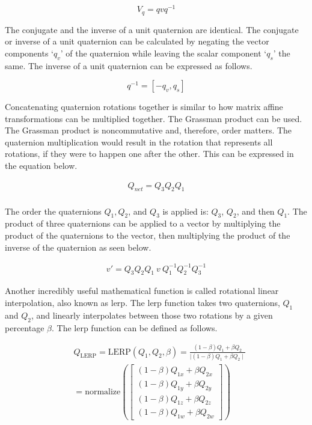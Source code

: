 \begin{equation}
	V_q = qvq^{-1}
\end{equation}

\noindent
The conjugate and the inverse of a unit quaternion are identical. The conjugate or inverse of a unit quaternion can be calculated by negating the vector components `$q_v$' of the quaternion while leaving the scalar component `$q_s$' the same. The inverse of a unit quaternion can be expressed as follows.

\begin{equation}
	q^{-1} = [-q_v, q_s]
\end{equation}

\noindent
Concatenating quaternion rotations together is similar to how matrix affine transformations can be multiplied together. The Grassman product can be used. The Grassman product is noncommutative and, therefore, order matters. The quaternion multiplication would result in the rotation that represents all rotations, if they were to happen one after the other. This can be expressed in the equation below.

\begin{equation}
\begin{aligned}
Q_{net} = Q_3 Q_2 Q_1\\
\end{aligned}
\end{equation}

\noindent
The order the quaternions $Q_1, Q_2$, and $Q_3$ is applied is: $Q_3$, $Q_2$, and then $Q_1$. The product of three quaternions can be applied to a vector by multiplying the product of the quaternions to the vector, then multiplying the product of the inverse of the quaternion as seen below. 

\begin{equation}
\begin{aligned}
v' = Q_3 Q_2 Q_1~ v~ Q_{1}^{-1} Q_{2}^{-1} Q_{3}^{-1}
\end{aligned}
\end{equation}

\noindent
Another incredibly useful mathematical function is called rotational linear interpolation, also known as \acrshort{lerp}. The \acrshort{lerp} function takes two quaternions, $Q_1$ and $Q_2$, and linearly interpolates between those two rotations by a given percentage  $\beta$. The \acrshort{lerp} function can be defined as follows.

\begin{equation}
\begin{aligned}
& Q_{\text{LERP}} = \text{LERP}(Q_1, Q_2, \beta) = \frac{(1-\beta)Q_1 + \beta Q_2}{\mid(1-\beta)Q_1 + \beta Q_2\mid} \\
& = \text{normalize} \left(\begin{bmatrix}
(1 - \beta) Q_{1x} + \beta Q_{2x}\\
(1 - \beta) Q_{1y} + \beta Q_{2y}\\
(1 - \beta) Q_{1z} + \beta Q_{2z}\\
(1 - \beta) Q_{1w} + \beta Q_{2w}					
\end{bmatrix}\right)
\end{aligned}
\end{equation}

